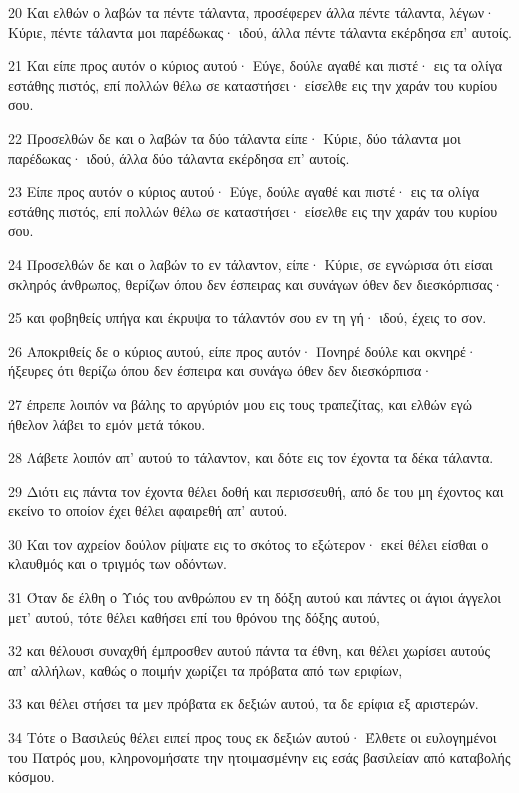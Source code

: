 \par 20 Και ελθών ο λαβών τα πέντε τάλαντα, προσέφερεν άλλα πέντε τάλαντα, λέγων· Κύριε, πέντε τάλαντα μοι παρέδωκας· ιδού, άλλα πέντε τάλαντα εκέρδησα επ' αυτοίς.
\par 21 Και είπε προς αυτόν ο κύριος αυτού· Εύγε, δούλε αγαθέ και πιστέ· εις τα ολίγα εστάθης πιστός, επί πολλών θέλω σε καταστήσει· είσελθε εις την χαράν του κυρίου σου.
\par 22 Προσελθών δε και ο λαβών τα δύο τάλαντα είπε· Κύριε, δύο τάλαντα μοι παρέδωκας· ιδού, άλλα δύο τάλαντα εκέρδησα επ' αυτοίς.
\par 23 Είπε προς αυτόν ο κύριος αυτού· Εύγε, δούλε αγαθέ και πιστέ· εις τα ολίγα εστάθης πιστός, επί πολλών θέλω σε καταστήσει· είσελθε εις την χαράν του κυρίου σου.
\par 24 Προσελθών δε και ο λαβών το εν τάλαντον, είπε· Κύριε, σε εγνώρισα ότι είσαι σκληρός άνθρωπος, θερίζων όπου δεν έσπειρας και συνάγων όθεν δεν διεσκόρπισας·
\par 25 και φοβηθείς υπήγα και έκρυψα το τάλαντόν σου εν τη γή· ιδού, έχεις το σον.
\par 26 Αποκριθείς δε ο κύριος αυτού, είπε προς αυτόν· Πονηρέ δούλε και οκνηρέ· ήξευρες ότι θερίζω όπου δεν έσπειρα και συνάγω όθεν δεν διεσκόρπισα·
\par 27 έπρεπε λοιπόν να βάλης το αργύριόν μου εις τους τραπεζίτας, και ελθών εγώ ήθελον λάβει το εμόν μετά τόκου.
\par 28 Λάβετε λοιπόν απ' αυτού το τάλαντον, και δότε εις τον έχοντα τα δέκα τάλαντα.
\par 29 Διότι εις πάντα τον έχοντα θέλει δοθή και περισσευθή, από δε του μη έχοντος και εκείνο το οποίον έχει θέλει αφαιρεθή απ' αυτού.
\par 30 Και τον αχρείον δούλον ρίψατε εις το σκότος το εξώτερον· εκεί θέλει είσθαι ο κλαυθμός και ο τριγμός των οδόντων.
\par 31 Όταν δε έλθη ο Υιός του ανθρώπου εν τη δόξη αυτού και πάντες οι άγιοι άγγελοι μετ' αυτού, τότε θέλει καθήσει επί του θρόνου της δόξης αυτού,
\par 32 και θέλουσι συναχθή έμπροσθεν αυτού πάντα τα έθνη, και θέλει χωρίσει αυτούς απ' αλλήλων, καθώς ο ποιμήν χωρίζει τα πρόβατα από των εριφίων,
\par 33 και θέλει στήσει τα μεν πρόβατα εκ δεξιών αυτού, τα δε ερίφια εξ αριστερών.
\par 34 Τότε ο Βασιλεύς θέλει ειπεί προς τους εκ δεξιών αυτού· Έλθετε οι ευλογημένοι του Πατρός μου, κληρονομήσατε την ητοιμασμένην εις εσάς βασιλείαν από καταβολής κόσμου.
